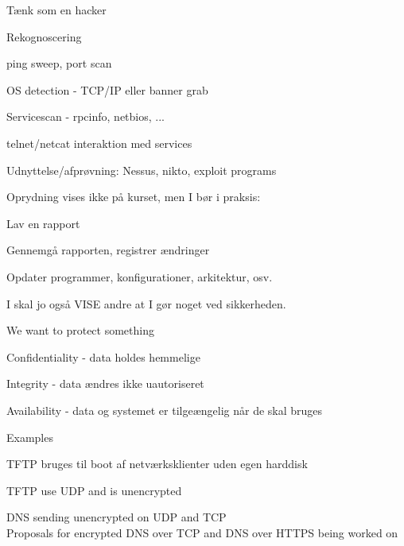 \documentclass[Screen16to9,17pt]{foils}
\begin{document}

\begin{list1}
\item Tænk som en hacker
\item Rekognoscering
\begin{list2}
\item ping sweep, port scan
\item OS detection - TCP/IP eller banner grab
\item Servicescan - rpcinfo, netbios, ...
\item telnet/netcat interaktion med services
\end{list2}
\item Udnyttelse/afprøvning: Nessus, nikto, exploit programs
\item Oprydning vises ikke på kurset, men I bør i praksis:
\begin{list2}
\item Lav en rapport
\item Gennemgå rapporten, registrer ændringer
\item Opdater programmer, konfigurationer, arkitektur, osv.
\end{list2}
\item I skal jo også VISE andre at I gør noget ved sikkerheden.
\end{list1}









\begin{list1}
\item We want to protect something
\item Confidentiality - data holdes hemmelige
\item Integrity - data ændres ikke uautoriseret
\item Availability - data og systemet er tilgeængelig når de skal bruges
\end{list1}




Examples
\begin{list2}
\item TFTP bruges til boot af netværksklienter uden egen harddisk
\item TFTP use UDP and is unencrypted
\item DNS sending unencrypted on UDP and TCP\\
Proposals for encrypted DNS over TCP and DNS over HTTPS being worked on
\end{list2}
\end{document}
